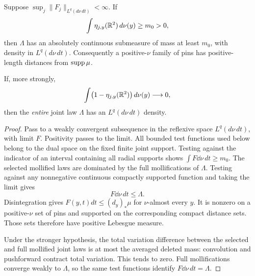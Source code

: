 \begin{proposition}
\label{selection:compactness}
Suppose \(\sup_j\|F_j\|_{L^q(d\nu\,dt)}<\infty\).
If
\[
 \int\eta_{j,y}(\mathbb R^2)\,d\nu(y)\ge m_0>0,
\]
then \(\Lambda\) has an absolutely continuous submeasure of mass at
least \(m_0\), with density in \(L^q(d\nu\,dt)\).
Consequently a positive-\(\nu\) family of pins has positive-length
distances from \(\operatorname{supp}\mu\).

If, more strongly,
\[
 \int\bigl(1-\eta_{j,y}(\mathbb R^2)\bigr)\,d\nu(y)\longrightarrow0,
\]
then the \emph{entire} joint law \(\Lambda\) has an \(L^q(d\nu\,dt)\)
density.
\end{proposition}
\begin{proof}
Pass to a weakly convergent subsequence in the reflexive space
\(L^q(d\nu\,dt)\), with limit \(F\). Positivity passes to the limit.
All bounded test functions used below belong to the dual space on the fixed
finite joint support.
Testing against the indicator of an interval containing all radial supports
shows \(\int F\dd\nu\,dt\ge m_0\).
The selected mollified laws are dominated by the full mollifications of
\(\Lambda\). Testing against any nonnegative continuous compactly
supported function and taking the limit gives
\[
 F\dd\nu\,dt\le\Lambda.
\]
Disintegration gives \(F(y,t)dt\le(d_y)_*\mu\) for \(\nu\)-almost
every \(y\). It is nonzero on a positive-\(\nu\) set of pins and
supported on the corresponding compact distance sets. Those sets therefore
have positive Lebesgue measure.

Under the stronger hypothesis, the total variation difference between the
selected and full mollified joint laws is at most the averaged deleted mass:
convolution and pushforward contract total variation. This tends to zero.
Full mollifications converge weakly to \(\Lambda\), so the same test
functions identify \(F\dd\nu\,dt=\Lambda\).
\end{proof}

